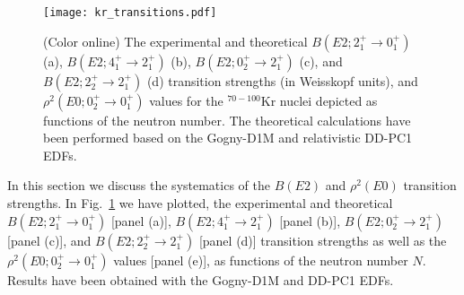 \documentclass[twocolumn,showpacs,amsmath,amssymb,superscriptaddress]{revtex4-1}
\begin{document}

\begin{figure}[htb!]
\begin{center}
\texttt{[image: kr\_transitions.pdf]}
\caption{(Color online) The experimental \cite{clement2007,data,kibedi2005} and
 theoretical $B(E2; 2^+_1\rightarrow 0^+_1)$ (a), 
 $B(E2; 4^+_1\rightarrow 2^+_1)$ (b), $B(E2; 0^+_2\rightarrow 2^+_1)$
 (c), and $B(E2; 2^+_2\rightarrow 2^+_1)$ (d) transition strengths (in
 Weisskopf units), and $\rho^2(E0; 0^+_2\rightarrow 0^+_1)$ values for
 the $^{70-100}$Kr nuclei depicted as functions of the neutron
 number. The theoretical calculations have been  performed based on the
 Gogny-D1M and relativistic  DD-PC1 EDFs.}
\label{fig:e2e0}
\end{center}
\end{figure}

In this section we discuss the 
systematics of the
$B(E2)$ and $\rho^2(E0)$ transition strengths. In Fig.~\ref{fig:e2e0} 
we have plotted, the 
experimental \cite{clement2007,data,kibedi2005} and
theoretical $B(E2; 2^+_1\rightarrow 0^+_1)$ [panel (a)], $B(E2; 4^+_1\rightarrow
2^+_1)$ [panel (b)], $B(E2; 0^+_2\rightarrow 2^+_1)$  [panel (c)], 
and $B(E2; 2^+_2\rightarrow 2^+_1)$ [panel (d)] transition strengths as well as
the $\rho^2(E0; 0^+_2\rightarrow 0^+_1)$ values [panel (e)], as functions of the neutron
number $N$. Results have been obtained with the Gogny-D1M and 
DD-PC1 EDFs.  
\end{document}
